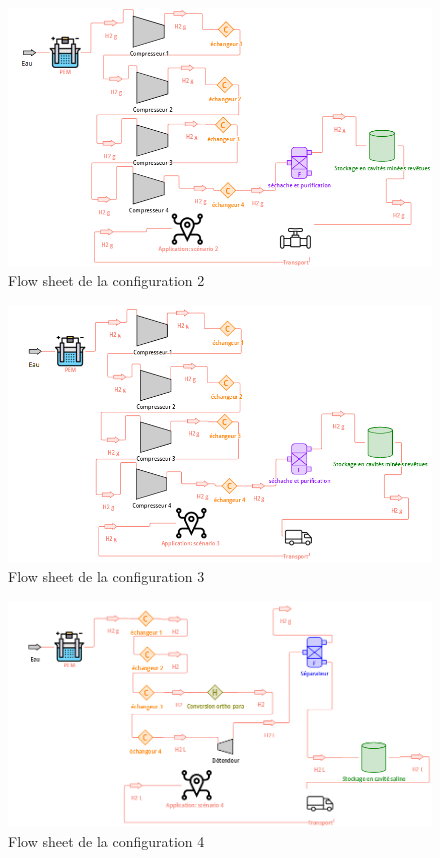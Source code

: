 \documentclass[11pt,french,a4paper]{article}
\begin{document}
\begin{figure}[h]
\centering
\includegraphics[width=0.8\linewidth]{image/annexe/annexe_flow/figure2annexea.png}
\caption{Flow sheet de la configuration 2 }
\end{figure}

\begin{figure}[h]
\centering
\includegraphics[width=0.8\linewidth]{image/annexe/annexe_flow/figure3annexea.png}
\caption{Flow sheet de la configuration 3 }
\end{figure}

\begin{figure}[h]
\centering
\includegraphics[width=0.8\linewidth]{image/annexe/annexe_flow/figure4annexea.png}
\caption{Flow sheet de la configuration 4 }
\end{figure}
\end{document}
